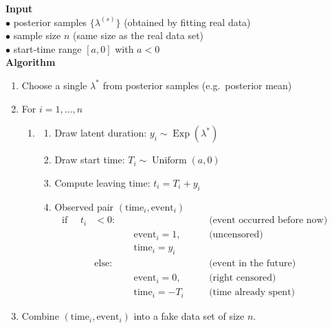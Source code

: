 \begin{tcolorbox}[
  title  = Algorithm 1: Simulating a Fake Survival Dataset (e.g.Posterior predictive model checking),
   fonttitle  = \small, 
  colback = white,
  colframe=black]
\textbf{Input}\\
\quad$\bullet$ posterior samples $\{\lambda^{(s)}\}$ \hfill (obtained by fitting real data)\\
\quad$\bullet$ sample size $n$ \hfill (same size as the real data set)\\
\quad$\bullet$ start‑time range $[a,0]$ with $a<0$ \\[6pt]
\textbf{Algorithm}\par
\begin{enumerate}
  \item Choose a single $\lambda^\ast$ from posterior samples \hfill (e.g.\ posterior mean)
  \item For $i = 1,\dots,n$
        \begin{enumerate}
          \item[] \hspace*{-10pt}%
          \begin{minipage}[t]{\linewidth}
          \begin{enumerate}
            \item Draw latent duration: $y_i \sim \operatorname{Exp}(\lambda^\ast)$
            \item Draw start time: $T_i \sim \operatorname{Uniform}(a,0)$
            \item Compute leaving time: $t_i = T_i + y_i$
            \item Observed pair $(\text{time}_i,\text{event}_i)$ \[\begin{aligned}
\text{if } \quad t_i &< 0: &&&\text{(event occurred before now)}\\
  &&\quad  \text{event}_i=1, &&\text{(uncensored)}\\ 
  &&\quad \text{time}_i=y_i
   &\quad \\
&\text{else}: &&&\text{(event in the future)}\\
   &&\quad \text{event}_i=0, &&\text{(right censored)}\\ 
   &&\quad \text{time}_i=-T_i &&\text{(time already spent)}
   &\quad 
\end{aligned}\]
          \end{enumerate}
          \end{minipage}
        \end{enumerate}
  \item Combine $(\text{time}_i,\text{event}_i)$ into a fake data set of size $n$.
\end{enumerate}
\label{fake data}
\end{tcolorbox}

